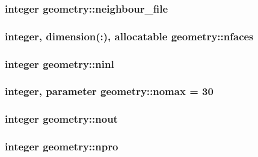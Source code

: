 \hypertarget{classgeometry_a76fd3a715a134c4e338b1bef0d53563b}{
\subsubsection[{neighbour\-\_\-file}]{\setlength{\rightskip}{0pt plus 5cm}integer geometry\-::neighbour\-\_\-file}}\label{classgeometry_a76fd3a715a134c4e338b1bef0d53563b}
\hypertarget{classgeometry_abc180e7f216d7319e972a77e754cf1ba}{
\subsubsection[{nfaces}]{\setlength{\rightskip}{0pt plus 5cm}integer, dimension(\-:), allocatable geometry\-::nfaces}}\label{classgeometry_abc180e7f216d7319e972a77e754cf1ba}
\hypertarget{classgeometry_a7c3a12b979532a42fd4791cd336b388f}{
\subsubsection[{ninl}]{\setlength{\rightskip}{0pt plus 5cm}integer geometry\-::ninl}}\label{classgeometry_a7c3a12b979532a42fd4791cd336b388f}
\hypertarget{classgeometry_aebf6156cf92933802643ed6612d80bcc}{
\subsubsection[{nomax}]{\setlength{\rightskip}{0pt plus 5cm}integer, parameter geometry\-::nomax = 30}}\label{classgeometry_aebf6156cf92933802643ed6612d80bcc}
\hypertarget{classgeometry_af185a2e42ce8dc5f660f52f4e844d883}{
\subsubsection[{nout}]{\setlength{\rightskip}{0pt plus 5cm}integer geometry\-::nout}}\label{classgeometry_af185a2e42ce8dc5f660f52f4e844d883}
\hypertarget{classgeometry_af9bcf0023987fb42899faea73e6e719d}{
\subsubsection[{npro}]{\setlength{\rightskip}{0pt plus 5cm}integer geometry\-::npro}}\label{classgeometry_af9bcf0023987fb42899faea73e6e719d}
